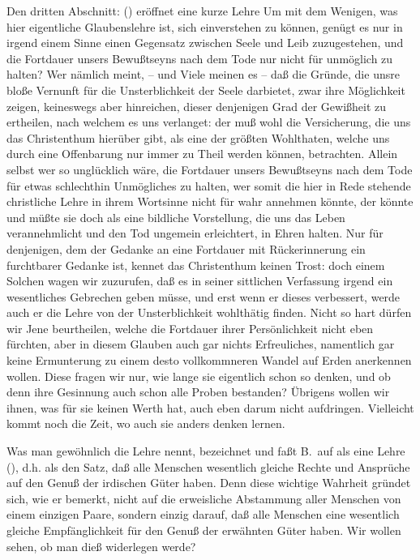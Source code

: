 \noindent{}\noindent
Den dritten Abschnitt:  () eröffnet eine kurze Lehre  Um mit dem Wenigen, was hier eigentliche Glaubenslehre ist, sich einverstehen zu können, genügt es nur in irgend einem Sinne einen Gegensatz zwischen Seele und Leib zuzugestehen, und die Fortdauer unsers Bewußtseyns nach dem Tode nur nicht für unmöglich zu halten? Wer nämlich meint, -- und Viele meinen es -- daß die Gründe, die unsre bloße Vernunft für die Unsterblichkeit der Seele darbietet, zwar ihre Möglichkeit zeigen, keineswegs aber hinreichen, dieser  denjenigen Grad der Gewißheit zu ertheilen, nach welchem es uns verlanget: der muß wohl die Versicherung, die uns das Christenthum hierüber gibt, als eine der größten Wohlthaten, welche uns durch eine Offenbarung nur immer zu Theil werden können, betrachten. Allein selbst wer so unglücklich wäre, die Fortdauer unsers Bewußtseyns nach dem Tode für etwas schlechthin Unmögliches zu halten, wer somit die hier in Rede stehende christliche Lehre in ihrem Wortsinne nicht für wahr annehmen könnte, der könnte und müßte sie doch als eine bildliche Vorstellung, die uns das Leben verannehmlicht und den Tod ungemein erleichtert, in Ehren halten. Nur für denjenigen, dem der Gedanke an eine Fortdauer mit Rückerinnerung ein furchtbarer Gedanke ist, kennet das Christenthum keinen Trost: doch einem Solchen wagen wir zuzurufen, daß es in seiner sittlichen Verfassung irgend ein wesentliches Gebrechen geben müsse, und erst wenn  er dieses verbessert, werde auch er die Lehre von der Unsterblichkeit wohlthätig finden. Nicht so hart dürfen wir Jene beurtheilen, welche die Fortdauer ihrer Persönlichkeit nicht eben fürchten, aber in diesem Glauben auch gar nichts Erfreuliches, namentlich gar keine Ermunterung zu einem desto vollkommneren Wandel auf Erden anerkennen wollen. Diese fragen wir nur, wie lange sie eigentlich schon so denken, und ob denn ihre Gesinnung auch schon alle Proben bestanden? Übrigens wollen wir ihnen, was für sie keinen Werth hat, auch eben darum nicht aufdringen. Vielleicht kommt noch die Zeit, wo auch sie anders denken lernen. \par
Was man gewöhnlich die Lehre  nennt, bezeichnet und faßt B.\ auf als eine Lehre  (), d.h. als den Satz, daß alle Menschen wesentlich gleiche Rechte und Ansprüche auf den Genuß der irdischen Güter haben. Denn diese wichtige Wahrheit gründet sich, wie er bemerkt, nicht auf die erweisliche Abstammung aller Menschen von einem einzigen Paare, sondern einzig darauf, daß alle Menschen eine wesentlich gleiche Empfänglichkeit für den Genuß der erwähnten Güter haben. Wir wollen sehen, ob man dieß widerlegen werde? \par
